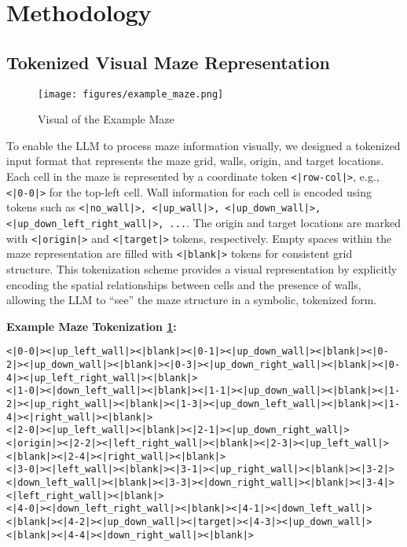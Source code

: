 \section{Methodology}
\label{sec:methodology}

\subsection{Tokenized Visual Maze Representation}{\label{sec:3.1}}
\label{subsec:tokenized_maze}
\begin{figure}
    \centering
    \texttt{[image: figures/example\_maze.png]}
    \caption{Visual of the Example Maze}
    \label{fig:example_maze}
\end{figure}
To enable the LLM to process maze information visually, we designed a tokenized input format that represents the maze grid, walls, origin, and target locations. Each cell in the maze is represented by a coordinate token \texttt{<|row-col|>}, e.g., \texttt{<|0-0|>} for the top-left cell. Wall information for each cell is encoded using tokens such as \texttt{<|no\_wall|>, <|up\_wall|>, <|up\_down\_wall|>, <|up\_down\_left\_right\_wall|>, ...}. The origin and target locations are marked with \texttt{<|origin|>} and \texttt{<|target|>} tokens, respectively. Empty spaces within the maze representation are filled with \texttt{<|blank|>} tokens for consistent grid structure. This tokenization scheme provides a visual representation by explicitly encoding the spatial relationships between cells and the presence of walls, allowing the LLM to ``see'' the maze structure in a symbolic, tokenized form.

\medskip
\noindent \textbf{Example Maze Tokenization \ref{fig:example_maze}:}

\begin{lstlisting}
<|0-0|><|up_left_wall|><|blank|><|0-1|><|up_down_wall|><|blank|><|0-2|><|up_down_wall|><|blank|><|0-3|><|up_down_right_wall|><|blank|><|0-4|><|up_left_right_wall|><|blank|>
<|1-0|><|down_left_wall|><|blank|><|1-1|><|up_down_wall|><|blank|><|1-2|><|up_right_wall|><|blank|><|1-3|><|up_down_left_wall|><|blank|><|1-4|><|right_wall|><|blank|>
<|2-0|><|up_left_wall|><|blank|><|2-1|><|up_down_right_wall|><|origin|><|2-2|><|left_right_wall|><|blank|><|2-3|><|up_left_wall|><|blank|><|2-4|><|right_wall|><|blank|>
<|3-0|><|left_wall|><|blank|><|3-1|><|up_right_wall|><|blank|><|3-2|><|down_left_wall|><|blank|><|3-3|><|down_right_wall|><|blank|><|3-4|><|left_right_wall|><|blank|>
<|4-0|><|down_left_right_wall|><|blank|><|4-1|><|down_left_wall|><|blank|><|4-2|><|up_down_wall|><|target|><|4-3|><|up_down_wall|><|blank|><|4-4|><|down_right_wall|><|blank|>
\end{lstlisting}

